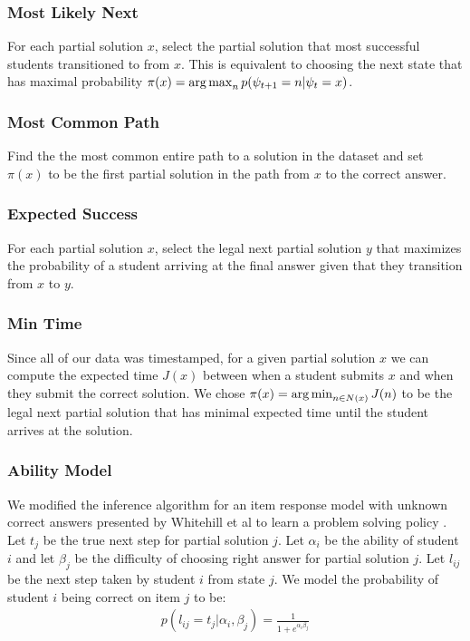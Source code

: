 \subsubsection{Most Likely Next}
For each partial solution $x$, select the partial solution that most successful students transitioned to from $x$. This is equivalent to choosing the next state that has maximal probability $\pi{(x)} = \operatorname*{arg\,max}_{n}{p(\psi_{t+1} = n | \psi_t = x)}$. 

\subsubsection{Most Common Path}
Find the the most common entire path to a solution in the dataset and set $\pi(x)$ to be the first partial solution in the path from $x$ to the correct answer.

\subsubsection{Expected Success}
For each partial solution $x$, select the legal next partial solution $y$ that maximizes the probability of a student arriving at the final answer given that they transition from $x$ to $y$. 

\subsubsection{Min Time}
Since all of our data was timestamped, for a given partial solution $x$ we can compute the expected time $J(x)$ between when a student submits $x$ and when they submit the correct solution. We chose $\pi(x) = \operatorname*{arg\,min}_{n \in N(x)}J(n)$ to be the legal next partial solution that has minimal expected time until the student arrives at the solution.

\subsubsection{Ability Model}

We modified the inference algorithm for an item response model with unknown correct answers presented by Whitehill et al to learn a problem solving policy \cite{whitehill2009whose}. Let $t_j$ be the true next step for partial solution $j$. Let $\alpha_i$ be the ability of student $i$ and let $\beta_j$ be the difficulty of choosing right answer for partial solution $j$. Let $l_{ij}$ be the next step taken by student $i$ from state $j$. We model the probability of student $i$ being correct on item $j$ to be:
\begin{align*}
p(l_{ij} = t_j | \alpha_i, \beta_j) = \frac{1}{1 + e^{\alpha_i \beta_j}}
\end{align*}

